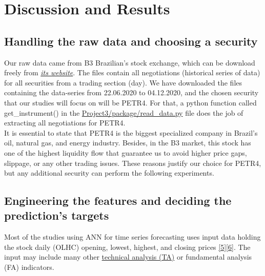 \section{Discussion and Results}
\label{chap:Discussion and Results}

\subsection{Handling the raw data and choosing a security}
\label{chap:Handling the raw data and choosing a security}

\quad Our raw data came from B3 Brazilian's stock exchange, which can be download freely from \href{http://www.b3.com.br/pt_br/market-data-e-indices/servicos-de-dados/market-data/cotacoes/cotacoes/}{\textit{its website}}. The files contain all negotiations (historical series of data) for all securities from a trading section (day). We have downloaded the files containing the data-series from 22.06.2020 to 04.12.2020, and the chosen security that our studies will focus on will be PETR4. For that, a python function called get\_instrument() in the \href{https://github.com/fabiorodp/UiO-FYS-STK4155/tree/master/Project3/package/read_data.py}{Project3/package/read\_data.py} file does the job of extracting all negotiations for PETR4.\\

It is essential to state that PETR4 is the biggest specialized company in Brazil's oil, natural gas, and energy industry. Besides, in the B3 market, this stock has one of the highest liquidity flow that guarantee us to avoid higher price gaps, slippage, or any other trading issues. These reasons justify our choice for PETR4, but any additional security can perform the following experiments.

\subsection{Engineering the features and deciding the prediction's targets}
\label{chap:Engineering the features and deciding the prediction's targets}

\quad Most of the studies using ANN for time series forecasting uses input data holding the stock daily (OLHC) opening, lowest, highest, and closing prices \hyperref[Bib:Leonardo C. Martinez, Diego N. da Hora, Joao R. de M. Palotti, Wagner Meira Jr. and Gisele L. Pappa]{[5]}\hyperref[Bib:Van-Dai Ta, Chuan-Ming Liu, Direselign Addis Tadesse]{[6]}. The input may include many other \hyperref[chap:Technical Analysis]{technical analysis (TA)} or fundamental analysis (FA) indicators.\\

